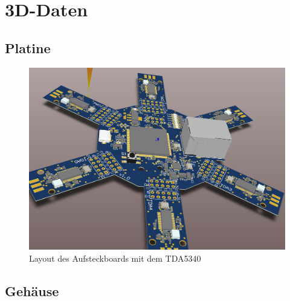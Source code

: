 \section{3D-Daten}
\label{app:3D}
\subsection{Platine}
\begin{figure}[h] 
	\centering
	\includegraphics[width=\textwidth]{Abbildungen/Aufnahmen/Bilder/Altium/3D2}
	\caption{Layout des Aufsteckboards mit dem TDA5340}
	\label{fig:3D}
\end{figure}
\subsection{Gehäuse}
\label{app:Gehäuse}